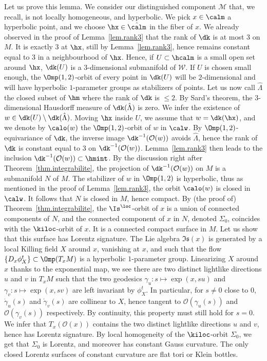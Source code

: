 Let us prove this lemma. We consider our distinguished component ${\mathcal M}$ that, we recall, is not locally homogeneous, and hyperbolic. We pick $x \in \calm$ a hyperbolic point, and we choose $\hx \in {\hat{\calm}}$ in the fiber of $x$. We already observed in the proof of Lemma~\ref{lem.rank3} that the rank of $\dk$ is at most $3$ on $M$. It is exactly $3$ at $\hx$, still by Lemma~\ref{lem.rank3}, hence remains constant equal to $3$ in a neighbourhood of $\hx$. Hence, if $U \subset \hcalm$ is a small open set around $\hx$, $\dk(U)$ is a $3$-dimensional submanifold of ${\mathcal W}$. If $U$ is chosen small enough, the $\Omp(1,2)$-orbit of every point in $\dk(U)$ will be $2$-dimensional and will have hyperbolic $1$-parameter groups as stabilizers of points. Let us now call $\hat{\Lambda}$ the closed subset of $\hm$ where the rank of $\dk$ is $ \leq2$. By Sard's theorem, the $3$-dimensional Hausdorff measure of $\dk(\hat{\Lambda})$ is zero. We infer the existence of $w \in \dk(U) \setminus \dk(\hat{\Lambda})$. Moving $\hx$ inside $U$, we assume that $w=\dk(\hx)$, and we denote by $\calo(w)$ the $\Omp(1,2)$-orbit of $w$ in $\calw$. By $\Omp(1,2)$-equivariance of $\dk$, the inverse image $\dk^{-1}({\mathcal O}(w))$ avoids $\hat{\Lambda}$, hence the rank of $\dk$ is constant equal to $3$ on $\dk^{-1}({\mathcal O}(w))$. Lemma~\ref{lem.rank3} then leads to the inclusion $\dk^{-1}({\mathcal O}(w)) \subset \hmint$. By the discussion right after Theorem~\ref{thm.integrabilite}, the projection of $\dk^{-1}({\mathcal O}(w))$ on $M$ is a submanifold $N$ of $M$. The stabilizer of $w$ in $\Omp(1,2)$ is hyperbolic, thus as mentioned in the proof of Lemma~\ref{lem.rank3}, the orbit $\calo(w)$ is closed in $\calw$. It follows that $N$ is closed in $M$, hence compact. By (the proof of) Theorem~\ref{thm.integrabilite}, the $\Is^{\loc}$-orbit of $x$ is a union of connected components of $N$, and the connected component of $x$ in $N$, denoted $\Sigma_{0}$, coincides with the $\kiloc$-orbit of $x$. It is a connected compact surface in $M$. Let us show that this surface has Lorentz signature. The Lie algebra $\mathfrak{Is}(x)$ is generated by a local Killing field $X$ around $x$, vanishing at $x$, and such that the flow $\{D_{x}\phi_X^t\}
\subset \Omp(T_{x}M)$ is a hyperbolic $1$-parameter group. Linearizing $X$ around $x$ thanks to the exponential map, we see there are two distinct lightlike directions $u$ and $v$ in ${T}_{x}M$ such that the two geodesics $\gamma_u: s \mapsto \exp(x,su)$ and $\gamma_v: s \mapsto \exp(x,sv)$ are left invariant by $\phi_X^t$. In particular, for $s \not =0$ close to $0$, $\dot{\gamma}_u(s)$ and $\dot{\gamma}_v(s)$ are collinear to $X$, hence tangent to ${\mathcal O}(\gamma_u(s))$ and ${\mathcal O}(\gamma_v(s))$ respectively. By continuity, this property must still hold for $s=0$. We infer that ${T}_{x}({\mathcal O}(x))$ contains the two distinct lightlike directions $u$ and $v$, hence has Lorentz signature. By local homogeneity of the $\kiloc$-orbit $\Sigma_0$, we get that $\Sigma_0$ is Lorentz, and moreover has constant Gauss curvature. The only closed Lorentz surfaces of constant curvature are flat tori or Klein bottles.

